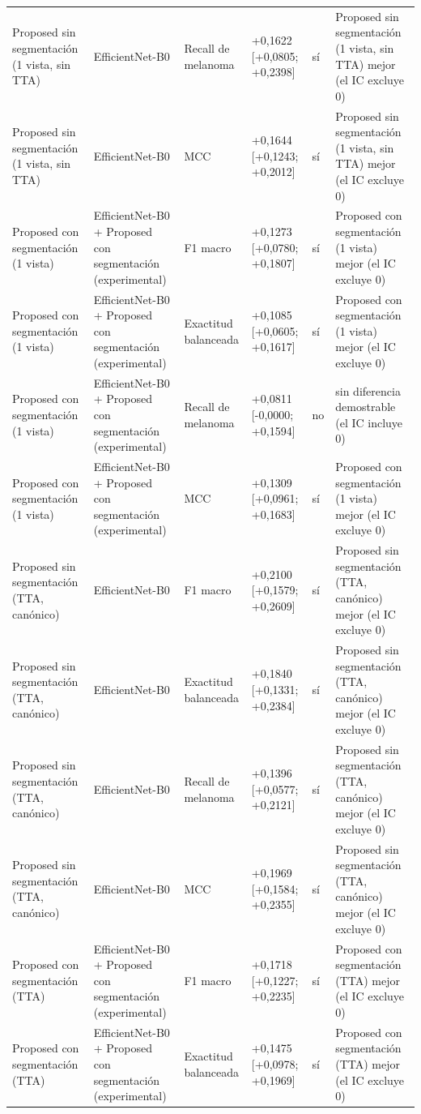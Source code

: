 \begin{longtable}{@{}llllll@{}}
Proposed sin segmentación (1 vista, sin TTA) & EfficientNet-B0 & Recall de melanoma & +0,1622 [+0,0805; +0,2398] & sí & Proposed sin segmentación (1 vista, sin TTA) mejor (el IC excluye 0) \\
Proposed sin segmentación (1 vista, sin TTA) & EfficientNet-B0 & MCC & +0,1644 [+0,1243; +0,2012] & sí & Proposed sin segmentación (1 vista, sin TTA) mejor (el IC excluye 0) \\
Proposed con segmentación (1 vista) & EfficientNet-B0 + Proposed con segmentación (experimental) & F1 macro & +0,1273 [+0,0780; +0,1807] & sí & Proposed con segmentación (1 vista) mejor (el IC excluye 0) \\
Proposed con segmentación (1 vista) & EfficientNet-B0 + Proposed con segmentación (experimental) & Exactitud balanceada & +0,1085 [+0,0605; +0,1617] & sí & Proposed con segmentación (1 vista) mejor (el IC excluye 0) \\
Proposed con segmentación (1 vista) & EfficientNet-B0 + Proposed con segmentación (experimental) & Recall de melanoma & +0,0811 [-0,0000; +0,1594] & no & sin diferencia demostrable (el IC incluye 0) \\
Proposed con segmentación (1 vista) & EfficientNet-B0 + Proposed con segmentación (experimental) & MCC & +0,1309 [+0,0961; +0,1683] & sí & Proposed con segmentación (1 vista) mejor (el IC excluye 0) \\
Proposed sin segmentación (TTA, canónico) & EfficientNet-B0 & F1 macro & +0,2100 [+0,1579; +0,2609] & sí & Proposed sin segmentación (TTA, canónico) mejor (el IC excluye 0) \\
Proposed sin segmentación (TTA, canónico) & EfficientNet-B0 & Exactitud balanceada & +0,1840 [+0,1331; +0,2384] & sí & Proposed sin segmentación (TTA, canónico) mejor (el IC excluye 0) \\
Proposed sin segmentación (TTA, canónico) & EfficientNet-B0 & Recall de melanoma & +0,1396 [+0,0577; +0,2121] & sí & Proposed sin segmentación (TTA, canónico) mejor (el IC excluye 0) \\
Proposed sin segmentación (TTA, canónico) & EfficientNet-B0 & MCC & +0,1969 [+0,1584; +0,2355] & sí & Proposed sin segmentación (TTA, canónico) mejor (el IC excluye 0) \\
Proposed con segmentación (TTA) & EfficientNet-B0 + Proposed con segmentación (experimental) & F1 macro & +0,1718 [+0,1227; +0,2235] & sí & Proposed con segmentación (TTA) mejor (el IC excluye 0) \\
Proposed con segmentación (TTA) & EfficientNet-B0 + Proposed con segmentación (experimental) & Exactitud balanceada & +0,1475 [+0,0978; +0,1969] & sí & Proposed con segmentación (TTA) mejor (el IC excluye 0) \\

\end{longtable}
